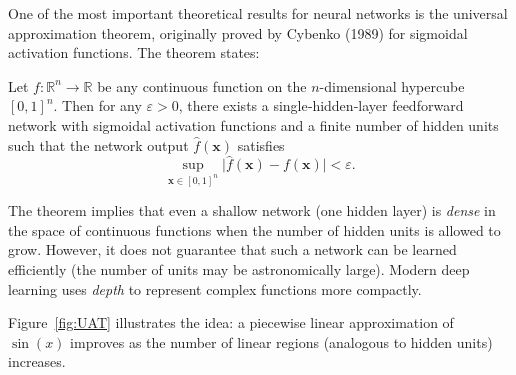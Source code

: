 \documentclass{tufte-handout}
\begin{document}
One of the most important theoretical results for neural networks is the universal approximation theorem, originally proved by Cybenko (1989) for sigmoidal activation functions. The theorem states:

\begin{theorem}[Cybenko, 1989]
    Let $f: \mathbb{R}^n \to \mathbb{R}$ be any continuous function on the $n$-dimensional hypercube $[0,1]^n$. Then for any $\varepsilon > 0$, there exists a single‑hidden‑layer feedforward network with sigmoidal activation functions and a finite number of hidden units such that the network output $\hat{f}(\mathbf{x})$ satisfies
    \[
    \sup_{\mathbf{x} \in [0,1]^n} \bigl| \hat{f}(\mathbf{x}) - f(\mathbf{x}) \bigr| < \varepsilon.
    \]
\end{theorem}

The theorem implies that even a shallow network (one hidden layer) is \textit{dense} in the space of continuous functions when the number of hidden units is allowed to grow. However, it does not guarantee that such a network can be learned efficiently (the number of units may be astronomically large). Modern deep learning uses \textit{depth} to represent complex functions more compactly.

Figure~\ref{fig:UAT} illustrates the idea: a piecewise linear approximation of $\sin(x)$ improves as the number of linear regions (analogous to hidden units) increases.
\end{document}

